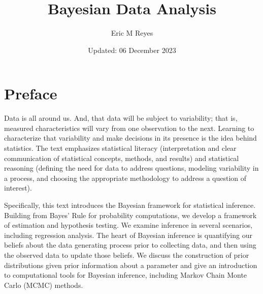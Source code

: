 \documentclass[
  letterpaper,
  DIV=11,
  numbers=noendperiod]{scrreprt}
\title{Bayesian Data Analysis}
\author{Eric M Reyes}
\date{Updated: 06 December 2023}
\renewcommand*\contentsname{Table of contents}
\newcommand\contentsname{Table of contents}
\theoremstyle{definition}
\theoremstyle{definition}
\theoremstyle{plain}
\theoremstyle{remark}
\begin{document}
\maketitle
\ifdefined\Shaded\renewenvironment{Shaded}{\begin{tcolorbox}[interior hidden, boxrule=0pt, borderline west={3pt}{0pt}{shadecolor}, enhanced, frame hidden, breakable, sharp corners]}{\end{tcolorbox}}\fi

\renewcommand*\contentsname{Table of contents}
{
\hypersetup{linkcolor=}
\setcounter{tocdepth}{2}
\tableofcontents
}

\hypertarget{preface}{%
\chapter*{Preface}\label{preface}}


\providecommand{\norm}[1]{\lVert#1\rVert}
\providecommand{\abs}[1]{\lvert#1\rvert}
\providecommand{\iid}{\stackrel{\text{IID}}{\sim}}
\providecommand{\ind}{\stackrel{\text{Ind}}{\sim}}

\providecommand{\bm}[1]{\mathbf{#1}}
\providecommand{\bs}[1]{\boldsymbol{#1}}
\providecommand{\bbeta}{\bs{\beta}}

\providecommand{\Ell}{\mathcal{L}}
\providecommand{\indep}{\perp\negthickspace\negmedspace\perp}

Data is all around us. And, that data will be subject to variability;
that is, measured characteristics will vary from one observation to the
next. Learning to characterize that variability and make decisions in
its presence is the idea behind statistics. The text emphasizes
statistical literacy (interpretation and clear communication of
statistical concepts, methods, and results) and statistical reasoning
(defining the need for data to address questions, modeling variability
in a process, and choosing the appropriate methodology to address a
question of interest).

Specifically, this text introduces the Bayesian framework for
statistical inference. Building from Bayes' Rule for probability
computations, we develop a framework of estimation and hypothesis
testing. We examine inference in several scenarios, including regression
analysis. The heart of Bayesian inference is quantifying our beliefs
about the data generating process prior to collecting data, and then
using the observed data to update those beliefs. We discuss the
construction of prior distributions given prior information about a
parameter and give an introduction to computational tools for Bayesian
inference, including Markov Chain Monte Carlo (MCMC) methods.
\end{document}
